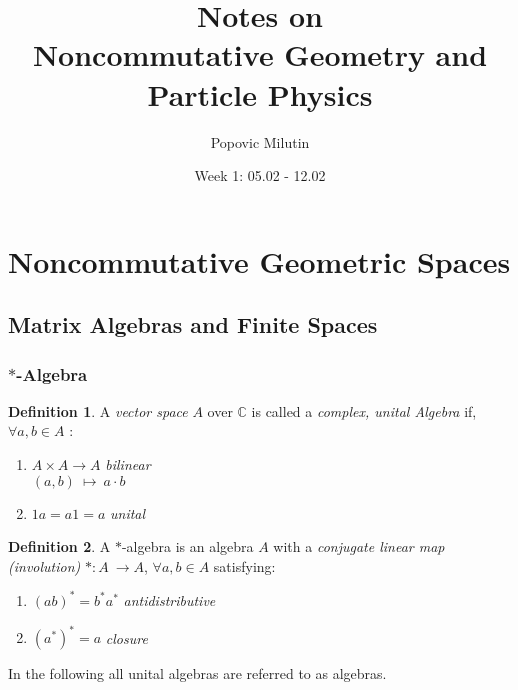 \documentclass[a4paper]{article}
\title{Notes on \\ Noncommutative Geometry and Particle Physics}
\author{Popovic Milutin}
\date{Week 1: 05.02 - 12.02}
\theoremstyle{definition}
\newtheorem{definition}{Definition}
\theoremstyle{definition}
\theoremstyle{definition}
\theoremstyle{theorem}
\theoremstyle{theorem}
\begin{document}
\maketitle
\tableofcontents

\section{Noncommutative Geometric Spaces}
\subsection{Matrix Algebras and Finite Spaces}
\subsubsection{$*$-Algebra}
\begin{definition}
    A \textit{vector space} $A$ over $\mathbb{C}$ is called a \textit{complex, unital Algebra} if, \\
    $\forall a,b \in A$ :
    \begin{enumerate}
        \item
            $A \times A \rightarrow A$       \hspace{0.1\textwidth} \textit{bilinear} \\
            $(a, b)\ \mapsto \ a\cdot b$
        \item
            $1a = a1 =a$                     \hspace{0.08\textwidth}  \textit{unital} \\
    \end{enumerate}
\end{definition}

\begin{definition}
    A $*$-algebra is an algebra $A$ with a \textit{conjugate linear map (involution)} $*:A\ \rightarrow  A$,
    $\forall a, b \in A$ satisfying:
    \begin{enumerate}
        \item
            $(ab)^* = b^*a^*$         \hspace{0.05\textwidth} \textit{antidistributive}
        \item
            $(a^*)^* = a$                   \hspace{0.1\textwidth} \textit{closure}
    \end{enumerate}
\end{definition}
In the following all unital algebras are referred to as algebras.
\end{document}
